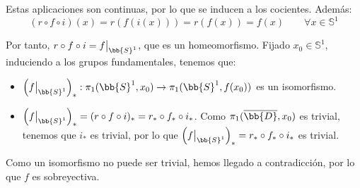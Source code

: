 \documentclass[12pt]{article}
\begin{document}
\begin{ejercicio}
\begin{description}
            Estas aplicaciones son continuas, por lo que se inducen a los cocientes. Además:
            \begin{equation*}
                (r\circ f\circ i)(x) = r(f(i(x))) = r(f(x)) = f(x)\qquad \forall x\in \mathbb{S}^1
            \end{equation*}

            Por tanto, $r\circ f\circ i=f\big|_{\bb{S}^1}$, que es un homeomorfismo. Fijado $x_0\in \mathbb{S}^1$, induciendo a los grupos fundamentales, tenemos que:
            \begin{itemize}
                \item $\left(f\big|_{\bb{S}^1}\right)_*:\pi_1(\bb{S}^1,x_0)\to \pi_1(\bb{S}^1,f(x_0))$ es un isomorfismo.
                \item $\left(f\big|_{\bb{S}^1}\right)_* = (r\circ f\circ i)_* = r_*\circ f_*\circ i_*$. Como $\pi_1(\overline{\bb{D}},x_0)$ es trivial, tenemos que $i_*$ es trivial, por lo que $\left(f\big|_{\bb{S}^1}\right)_*=r_*\circ f_*\circ i_*$ es trivial.
            \end{itemize}

            Como un isomorfismo no puede ser trivial, hemos llegado a contradicción, por lo que $f$ es sobreyectiva.
        \end{description}
    \end{ejercicio}
\end{document}
